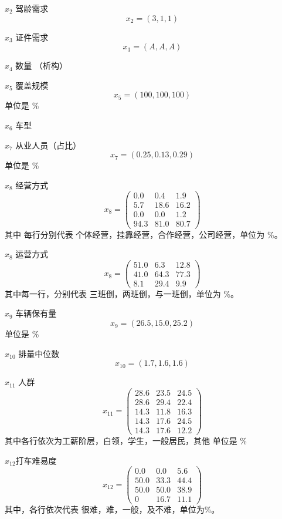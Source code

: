 \documentclass{ctexart}
\begin{document}
    $x_2$ 驾龄需求
    $$x_2=(3,1,1)$$
    
    $x_3$ 证件需求
    $$x_3=(A,A,A)$$
    
    $x_4$ 数量 （析构）
    
    $x_5$ 覆盖规模
    $$x_5=(100,100,100)$$
    单位是 \%
    
    $x_6$ 车型
    
    $x_7$ 从业人员（占比）
    $$x_7=(0.25,0.13,0.29)$$
    单位是 \%
    
    $x_8$ 经营方式
    $$x_8=\left(\begin{array}{ccc}
    0.0 & 0.4 & 1.9 \\
    5.7 & 18.6 & 16.2\\
    0.0 & 0.0 & 1.2\\
    94.3 & 81.0 & 80.7
    \end{array}\right)$$
    其中 每行分别代表 个体经营，挂靠经营，合作经营，公司经营，单位为 \%。
    
    $x_8$ 运营方式
    $$x_8=\left(\begin{array}{ccc}
    51.0 & 6.3 & 12.8 \\
    41.0 & 64.3 & 77.3 \\
    8.1 & 29.4 & 9.9
    \end{array}\right)$$
    其中每一行，分别代表 三班倒，两班倒，与一班倒，单位为 \%。
    
    $x_9$ 车辆保有量
    $$x_9 =(26.5, 15.0 ,25.2)$$
    单位是 \%
    
    $x_{10}$ 排量中位数
    $$x_{10} = (1.7,1.6,1.6)$$
    
    $x_{11}$ 人群
    $$x_{11} = \left(\begin{array}{ccc}
    28.6 & 23.5 & 24.5\\
    28.6 & 29.4 & 22.4\\
    14.3 & 11.8 & 16.3\\
    14.3 & 17.6 & 24.5\\
    14.3 & 17.6 & 12.2
    \end{array}\right)$$
    其中各行依次为工薪阶层，白领，学生，一般居民，其他
    单位是 \%
    
    $x_{12}$打车难易度
    $$x_{12}=\left(\begin{array}{ccc}
    0.0 & 0.0 & 5.6\\
    50.0 & 33.3 & 44.4\\
    50.0 & 50.0 & 38.9\\
    0 & 16.7 & 11.1
    \end{array}\right)$$
    其中，各行依次代表 很难，难，一般，及不难，单位为\%。
\end{document}
